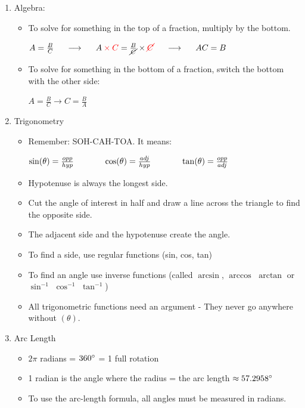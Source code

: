 \documentclass[letterpaper, 12pt]{article}
\begin{document}
\begin{enumerate}
	\vspace{0.25in}
	\item Algebra:
	\begin{itemize}
		\item To solve for something in the top of a fraction, multiply by the bottom.
		\begin{center}
			$A = \frac {B}{C} \hspace{0.2in} \longrightarrow \hspace{0.2in} A \color{red} \times C \color{black} = \frac {B}{\cancel{C}} \times \color{red} \cancel{C} \hspace{0.2in} \color{black} \longrightarrow  \hspace{0.2in} A C = B	$
		\end{center}
		\item To solve for something in the bottom of a fraction, switch the bottom with the other side:
		\begin{center}
			$A = \frac {B}{C} \rightarrow C = \frac {B}{A}	$
		\end{center}
		\end{itemize}
	\vspace{2in} 
	\item Trigonometry
	\begin{itemize}
		\item Remember: SOH-CAH-TOA.  It means:
		\begin{center}
			$\sin(\theta) = \frac{opp}{hyp} \hspace{0.5in} \cos(\theta) = \frac{adj}{hyp} \hspace{0.5in} \tan(\theta) = \frac{opp}{adj}	$	
		\end{center}
	\item Hypotenuse is always the longest side.
	\item Cut the angle of interest in half and draw a line across the triangle to find the opposite side.
	\item The adjacent side and the hypotenuse create the angle.
	\item To find a side, use regular functions (sin, cos, tan)
	\item To find an angle use inverse functions (called $\arcsin$, $\arccos$ $\arctan$ or $\sin^{-1}$ $\cos^{-1}$ $\tan^{-1}$)
	\item All trigonometric functions need an argument - They never go anywhere without $(\theta)$.	
	\end{itemize}
	
	\item Arc Length
	\begin{itemize}
		\item $2\pi $ radians = $360 \degree $  = 1 full rotation
		\item 1 radian is the angle where the radius = the arc length $\approx 57.2958\degree$
		\item To use the arc-length formula, all angles must be measured in radians.
	\end{itemize}
\end{enumerate}
 
\end{document}

